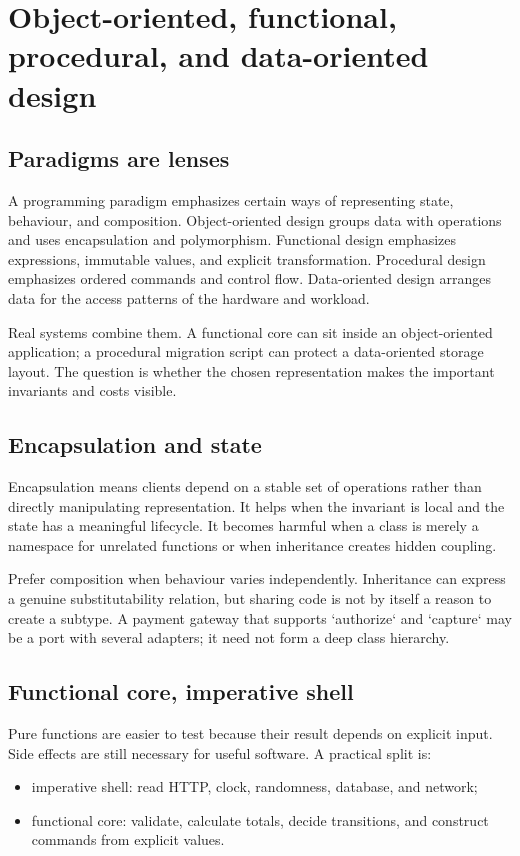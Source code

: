 \chapter{Object-oriented, functional, procedural, and data-oriented design}

\section{Paradigms are lenses}
A programming paradigm emphasizes certain ways of representing state,
behaviour, and composition. Object-oriented design groups data with operations
and uses encapsulation and polymorphism. Functional design emphasizes expressions,
immutable values, and explicit transformation. Procedural design emphasizes
ordered commands and control flow. Data-oriented design arranges data for the
access patterns of the hardware and workload.

Real systems combine them. A functional core can sit inside an object-oriented
application; a procedural migration script can protect a data-oriented storage
layout. The question is whether the chosen representation makes the important
invariants and costs visible.

\section{Encapsulation and state}
Encapsulation means clients depend on a stable set of operations rather than
directly manipulating representation. It helps when the invariant is local and
the state has a meaningful lifecycle. It becomes harmful when a class is merely a
namespace for unrelated functions or when inheritance creates hidden coupling.

Prefer composition when behaviour varies independently. Inheritance can express
a genuine substitutability relation, but sharing code is not by itself a reason
to create a subtype. A payment gateway that supports `authorize` and `capture`
may be a port with several adapters; it need not form a deep class hierarchy.

\section{Functional core, imperative shell}
Pure functions are easier to test because their result depends on explicit input.
Side effects are still necessary for useful software. A practical split is:

\begin{itemize}
  \item imperative shell: read HTTP, clock, randomness, database, and network;
  \item functional core: validate, calculate totals, decide transitions, and
        construct commands from explicit values.
\end{itemize}

